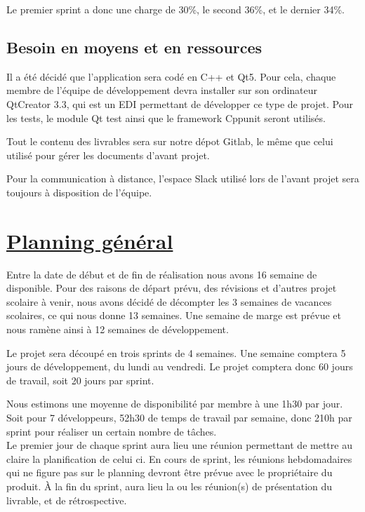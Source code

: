 \documentclass{../res/univ-projet}
\begin{document}
Le premier sprint a donc une charge de 30\%, le second 36\%, et le dernier 34\%.

\subsection{Besoin en moyens et en ressources}

Il a été décidé que l'application sera codé en C++ et Qt5. Pour cela, chaque membre de l'équipe de développement devra installer sur son ordinateur 
QtCreator 3.3, qui est un EDI permettant de développer ce type de projet. Pour les tests, le module Qt test ainsi que le framework Cppunit seront utilisés.

Tout le contenu des livrables sera sur notre dépot Gitlab, le même que celui utilisé pour gérer les documents d'avant projet.

Pour la communication à distance, l'espace Slack utilisé lors de l'avant projet sera toujours à disposition de l'équipe.
\newpage

\section{\underline{Planning général}}

Entre la date de début et de fin de réalisation nous avons 16 semaine de disponible. Pour des raisons de départ prévu, des révisions et d'autres projet 
scolaire à venir, nous avons décidé de décompter les 3 semaines de vacances scolaires, ce qui nous donne 13 semaines. Une semaine de marge est prévue 
et nous ramène ainsi à 12 semaines de développement. 

Le projet sera découpé en trois sprints de 4 semaines. Une semaine comptera 5 jours de développement, du lundi au 
vendredi. Le projet comptera donc 60 jours de travail, soit 20 jours par sprint.

Nous estimons une moyenne de disponibilité par membre à une 1h30 par jour. Soit pour 7 développeurs, 52h30 de temps de travail par semaine, donc 
210h par sprint pour réaliser un certain nombre de tâches. \\

Le premier jour de chaque sprint aura lieu une réunion permettant de mettre au claire la planification de celui ci. En cours de sprint, les réunions 
hebdomadaires qui ne figure pas sur le planning devront être prévue avec le propriétaire du produit. \`{A} la fin du sprint, aura lieu la 
ou les réunion(s) de présentation du livrable, et de rétrospective. \\
\end{document}
